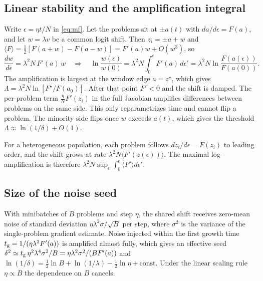 \subsection{Linear stability and the amplification integral}
\label{app:stability}
Write $\epsilon=\eta t/N$ in \cref{eq:mf}.
Let the problems sit at $\pm a(t)$ with $da/d\epsilon=F(a)$, and let $w=\lambda v$ be a common logit shift.
Then $z_i=\pm a+w$ and $\langle F\rangle=\tfrac12[F(a+w)-F(a-w)]=F'(a)w+O(w^3)$, so
\begin{equation*}
  \frac{dw}{d\epsilon}=\lambda^2N\,F'(a)\,w\quad\Rightarrow\quad
  \ln\frac{w(\epsilon)}{w(0)}=\lambda^2N\int_0^\epsilon F'(a)\,d\epsilon'=\lambda^2N\ln\frac{F(a(\epsilon))}{F(a(0))}.
\end{equation*}
The amplification is largest at the window edge $a=z^\star$, which gives $\Lambda=\lambda^2N\ln[F^\star/F(a_0)]$.
After that point $F'<0$ and the shift is damped.
The per-problem term $\frac{\eta}{N}F'(z_i)$ in the full Jacobian amplifies differences between problems on the same side. This only reparametrizes time and cannot flip a problem.
The minority side flips once $w$ exceeds $a(t)$, which gives the threshold $\Lambda\approx\ln(1/\delta)+O(1)$.

For a heterogeneous population, each problem follows $dz_i/d\epsilon=F(z_i)$ to leading order, and the shift grows at rate $\lambda^2N\langle F'(z(\epsilon))\rangle$. The maximal log-amplification is therefore $\lambda^2N\sup_\epsilon\int_0^\epsilon\langle F'\rangle d\epsilon'$.

\subsection{Size of the noise seed}
\label{app:seed}
With minibatches of $B$ problems and step $\eta$, the shared shift receives zero-mean noise of standard deviation $\eta\lambda^2\sigma/\sqrt B$ per step, where $\sigma^2$ is the variance of the single-problem gradient estimate.
Noise injected within the first growth time $t_{\rm g}=1/(\eta\lambda^2F'(a))$ is amplified almost fully, which gives an effective seed $\delta^2\simeq t_{\rm g}\,\eta^2\lambda^4\sigma^2/B=\eta\lambda^2\sigma^2/(BF'(a))$ and $\ln(1/\delta)=\tfrac12\ln B+\ln(1/\lambda)-\tfrac12\ln\eta+\text{const}$.
Under the linear scaling rule $\eta\propto B$ the dependence on $B$ cancels.

